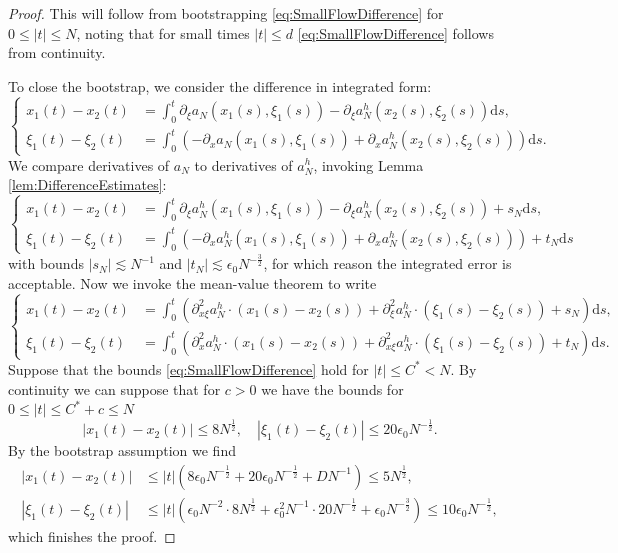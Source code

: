 \documentclass{amsart}
\numberwithin{equation}{section}
\theoremstyle{definition}
\newcommand {\ud}{\mathrm{d}}
\begin{document}
\begin{proof}
This will follow from bootstrapping \eqref{eq:SmallFlowDifference} for $0 \leq |t| \leq N$, noting that for small times $|t| \leq d$ \eqref{eq:SmallFlowDifference} follows from continuity.

To close the bootstrap, we consider the difference in integrated form:
\begin{equation*}
\left\{\!\begin{array}{cl}
x_1(t) - x_2(t) &= \int_0^t \partial_{\xi} a_N(x_1(s),\xi_1(s)) - \partial_{\xi} a_N^h(x_2(s),\xi_2(s)) \ud s, \\
\xi_1(t) - \xi_2(t) &= \int_0^t (-\partial_x a_N(x_1(s),\xi_1(s)) + \partial_x a_N^h(x_2(s),\xi_2(s))) \ud s.
\end{array} \right.
\end{equation*}
We compare derivatives of $a_N$ to derivatives of $a_N^h$, invoking Lemma \ref{lem:DifferenceEstimates}:
\begin{equation*}
\left\{\!\begin{array}{cl}
x_1(t) - x_2(t) &= \int_0^t \partial_{\xi} a_N^{h}(x_1(s),\xi_1(s)) - \partial_{\xi} a_N^h(x_2(s),\xi_2(s)) + s_N \ud s, \\
\xi_1(t) - \xi_2(t) &= \int_0^t (-\partial_x a_N^h(x_1(s),\xi_1(s)) + \partial_x a_N^h(x_2(s),\xi_2(s))) + t_N \ud s
\end{array} \right.
\end{equation*}
with bounds $|s_N| \lesssim N^{-1}$ and $|t_N| \lesssim \epsilon_0 N^{-\frac{3}{2}}$, for which reason the integrated error is acceptable. Now we invoke the mean-value theorem to write
\begin{equation*}
\left\{ \begin{array}{cl}
x_1(t) - x_2(t) &= \int_0^t ( \partial^2_{x \xi} a_N^h \cdot (x_1(s) - x_2(s)) + \partial^2_{\xi} a_N^h \cdot (\xi_1(s)-\xi_2(s)) + s_N) \ud s, \\
\xi_1(t) - \xi_2(t) &= \int_0^t (\partial^2_{x} a_N^h \cdot (x_1(s) - x_2(s)) + \partial^2_{x \xi} a_N^h \cdot (\xi_1(s) - \xi_2(s)) + t_N) \ud s.
\end{array} \right.
\end{equation*}
Suppose that the bounds \eqref{eq:SmallFlowDifference} hold for $|t| \leq C^* < N$. By continuity we can suppose that for $c > 0$ we have the bounds for $0 \leq |t| \leq C^* + c \leq N$ 
\begin{equation*}
|x_1(t) - x_2(t) | \leq 8 N^{\frac{1}{2}}, \quad |\xi_1(t) -\xi_2(t) | \leq 20 \epsilon_0 N^{-\frac{1}{2}}.
\end{equation*}
By the bootstrap assumption we find
\begin{equation*}
\begin{split}
|x_1(t) - x_2(t)| &\leq |t| ( 8 \epsilon_0 N^{-\frac{1}{2}} + 20 \epsilon_0 N^{-\frac{1}{2}} + D N^{-1} ) \leq 5 N^{\frac{1}{2}}, \\
|\xi_1(t) - \xi_2(t)| &\leq |t| (\epsilon_0 N^{-2} \cdot 8 N^{\frac{1}{2}} + \epsilon_0^2 N^{-1} \cdot 20 N^{-\frac{1}{2}} + \epsilon_0 N^{-\frac{3}{2}} ) \leq 10 \epsilon_0 N^{-\frac{1}{2}},
\end{split}
\end{equation*}
which finishes the proof.
\end{proof}
\end{document}
